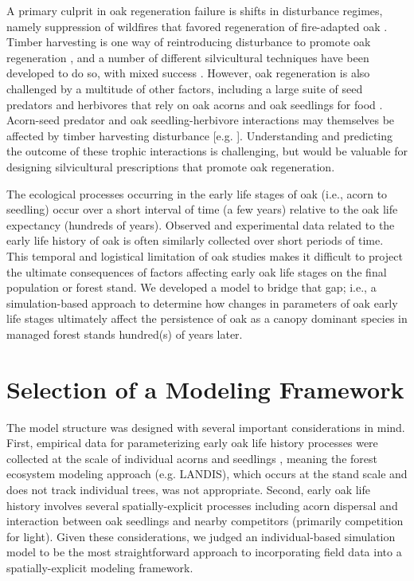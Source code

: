 \documentclass[
11pt, %
a4paper, %
oneside, %
headinclude,footinclude, %
]{scrartcl}
\begin{document}
A primary culprit in oak regeneration failure is shifts in disturbance regimes, namely suppression of wildfires that favored regeneration of fire-adapted oak \citep{Abrams1992}. Timber harvesting is one way of reintroducing disturbance to promote oak regeneration \citep{Dey2002}, and a number of different silvicultural techniques have been developed to do so, with mixed success \citep{Morrissey2008, Swaim2016}. However, oak regeneration is also challenged by a multitude of other factors, including a large suite of seed predators and herbivores that rely on oak acorns and oak seedlings for food \citep{Mcshea2000, Mcshea1993, Mcshea2007}. Acorn-seed predator and oak seedling-herbivore interactions may themselves be affected by timber harvesting disturbance [e.g. \citealp{Bellocq2005, Lombardo2008, Miller2009, Crimmins2010, Kellner2014b}]. Understanding and predicting the outcome of these trophic interactions is challenging, but would be valuable for designing silvicultural prescriptions that promote oak regeneration.

The ecological processes occurring in the early life stages of oak (i.e., acorn to seedling) occur over a short interval of time (a few years) relative to the oak life expectancy (hundreds of years). Observed and experimental data related to the early life history of oak is often similarly collected over short periods of time. This temporal and logistical limitation of oak studies makes it difficult to project the ultimate consequences of factors affecting early oak life stages on the final population or forest stand. We developed a model to bridge that gap; i.e., a simulation-based approach to determine how changes in parameters of oak early life stages ultimately affect the persistence of oak as a canopy dominant species in managed forest stands hundred(s) of years later. 

\section{Selection of a Modeling Framework}
\label{selection}

The model structure was designed with several important considerations in mind. First, empirical data for parameterizing early oak life history processes were collected at the scale of individual acorns and seedlings \citep{Kellner2014b, Kellner2015a, Kellner2016}, meaning the forest ecosystem modeling approach (e.g. LANDIS), which occurs at the stand scale and does not track individual trees, was not appropriate. Second, early oak life history involves several spatially-explicit processes including acorn dispersal and interaction between oak seedlings and nearby competitors (primarily competition for light). Given these considerations, we judged an individual-based simulation model to be the most straightforward approach to incorporating field data into a spatially-explicit modeling framework.
\end{document}
